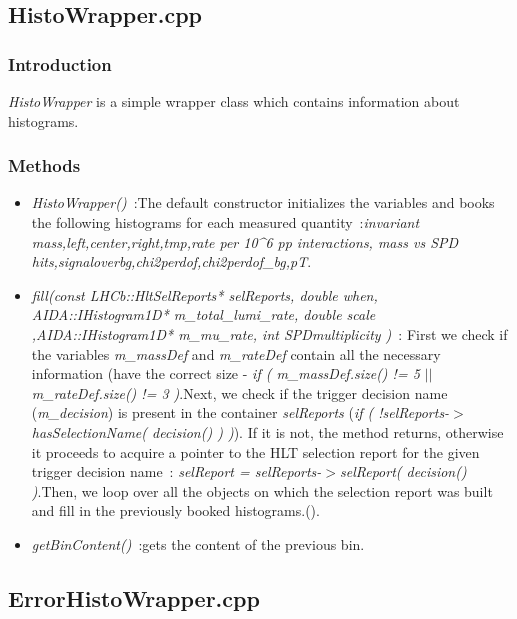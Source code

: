 \subsection{\textbf{HistoWrapper.cpp}}\label{sec:histWrap}
\subsubsection{\textbf{Introduction}}
\textit{HistoWrapper} is a simple wrapper class which contains information about histograms.\par

\subsubsection{\textbf{Methods}}
\begin{itemize}
\item \textit{HistoWrapper()}~:The default constructor initializes the variables and books the following histograms for each measured quantity~:\textit{invariant mass,left,center,right,tmp,rate per 10^6 pp interactions, mass vs SPD hits,signaloverbg,chi2perdof,chi2perdof\_bg,pT}.\par
\item \textit{fill(const LHCb::HltSelReports* selReports, double when, AIDA::IHistogram1D* m\_total\_lumi\_rate, double scale ,AIDA::IHistogram1D* m\_mu\_rate, int SPDmultiplicity )}~: First we check if the variables \textit{m\_massDef} and \textit{m\_rateDef} contain all the necessary information (have the correct size - \textit{if ( m\_massDef.size() != 5 $||$ m\_rateDef.size() != 3 )}.Next, we check if the trigger decision name (\textit{m\_decision}) is present in the container \textit{selReports} (\textit{if ( !selReports-$>$hasSelectionName( decision() ) )}). If it is not, the method returns, otherwise it proceeds to acquire a pointer to the HLT selection report for the given trigger decision name~: \textit{selReport = selReports-$>$selReport( decision() )}.Then, we loop over all the objects on which the selection report was built and fill in the previously booked histograms.(\cite{hltobjectsum}).\par
\item \textit{getBinContent()}~:gets the content of the previous bin.\par

\end{itemize}

\subsection{\textbf{ErrorHistoWrapper.cpp}}
